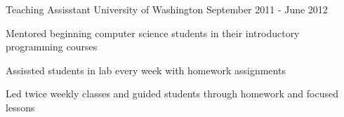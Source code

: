 \begin{cventries}
  \cventry
    {Teaching Assisstant} %
    {University of Washington} %
    {} %
    {September 2011 - June 2012} %
    {
	\begin{cvitems} %
    \item {Mentored beginning computer science students in their introductory programming courses}
    \item {Assissted students in lab every week with homework assignments}
    \item {Led twice weekly classes and guided students through homework and focused lessons}
	\end{cvitems}
    }

    

\end{cventries}
